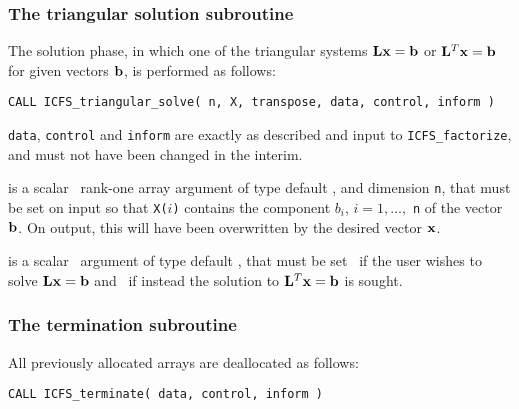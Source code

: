 \documentclass{galahad}
\newcommand{\packagename}{ICFS}
\begin{document}

\subsubsection{The triangular solution subroutine}

The solution phase, in which one of the triangular systems
${\mathbf{L}} {\mathbf{x}} = {\mathbf{b}}$ or ${\mathbf{L}}^T {\mathbf{x}} = {\mathbf{b}}$ for given vectors ${\mathbf{b}}$, 
is performed as follows:
\vspace*{1mm}

\hspace{8mm}
{\tt CALL \packagename\_triangular\_solve( n, X, transpose, data, control, inform )}
\vspace*{-1mm}

\begin{description}
 {\tt data}, {\tt control} and {\tt inform} are 
exactly as described and input to {\tt \packagename\_factorize},
and must not have been changed in the interim.

 is a scalar \intentinout\ rank-one array argument of type 
default \realdp, and dimension {\tt n}, that  must be set on input so that
{\tt X(}$i${\tt)} contains the component $b_i$, $i = 1, \ldots,$ {\tt n}
of the vector ${\mathbf{b}}$. On output, this will have been overwritten by the
desired vector ${\mathbf{x}}$.

 is a scalar \intentin\ argument of type 
default \logical, that must be set \false\ if the user wishes to solve
${\mathbf{L}} {\mathbf{x}} = {\mathbf{b}}$ and \true\ if instead the solution to ${\mathbf{L}}^T {\mathbf{x}} = {\mathbf{b}}$ 
is sought.

\end{description}


\subsubsection{The  termination subroutine}
All previously allocated arrays are deallocated as follows:
\vspace*{1mm}

\hspace{8mm}
{\tt CALL \packagename\_terminate( data, control, inform )}
\end{document}
